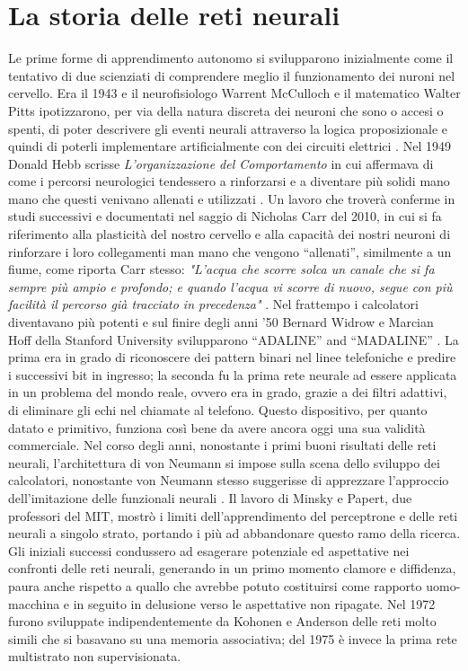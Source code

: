 \section*{La storia delle reti neurali}
Le prime forme di apprendimento autonomo si svilupparono inizialmente come il tentativo di due scienziati di  comprendere meglio il funzionamento dei nuroni nel cervello.
Era il 1943 e il neurofisiologo Warrent McCulloch e il matematico Walter Pitts ipotizzarono, per via della natura discreta dei neuroni che sono o accesi o spenti, di poter descrivere gli eventi neurali attraverso la logica proposizionale e quindi di poterli implementare artificialmente con dei circuiti elettrici \cite{mcculloch1943logical}.
Nel 1949 Donald Hebb scrisse \textit{L'organizzazione del Comportamento} in cui affermava di come i percorsi neurologici tendessero a rinforzarsi e a diventare più solidi mano mano che questi venivano allenati e utilizzati \cite{hebb1961organization}. Un lavoro che troverà conferme in studi successivi e documentati nel saggio di Nicholas Carr del 2010, in cui si fa riferimento alla plasticità del nostro cervello e alla capacità dei nostri neuroni di rinforzare i loro collegamenti man mano che vengono ``allenati'', similmente a un fiume, come riporta Carr stesso: \emph{"L'acqua che scorre solca un canale che si fa sempre più ampio e profondo; e quando l'acqua vi scorre di nuovo, segue con più facilità il percorso già tracciato in precedenza"} \cite{carr2010shallows}.
Nel frattempo i calcolatori diventavano più potenti e sul finire degli anni '50 Bernard Widrow e Marcian Hoff della Stanford University svilupparono ``ADALINE'' and ``MADALINE'' \cite{widrow1960adaptive}. La prima era in grado di riconoscere dei pattern binari nel linee telefoniche e predire i successivi bit in ingresso; la seconda fu la prima rete neurale ad essere applicata in un problema del mondo reale, ovvero era in grado, grazie a dei filtri adattivi, di eliminare gli echi nel chiamate al telefono. Questo dispositivo, per quanto datato e primitivo, funziona così bene da avere ancora oggi una sua validità commerciale.
Nel corso degli anni, nonostante i primi buoni risultati delle reti neurali, l'architettura di von Neumann si impose sulla scena dello sviluppo dei calcolatori, nonostante von Neumann stesso suggerisse di apprezzare l'approccio dell'imitazione delle funzionali neurali \cite{stanford_history}.
Il lavoro di Minsky e Papert, due professori del MIT, mostrò i limiti dell'apprendimento del perceptrone e delle reti neurali a singolo strato, portando i più ad abbandonare questo ramo della ricerca\cite{minsky2017perceptrons}. Gli iniziali successi condussero ad esagerare potenziale ed aspettative nei confronti delle reti neurali, generando in un primo momento clamore e diffidenza, paura anche rispetto a quallo che avrebbe potuto costituirsi come rapporto uomo-macchina e in seguito in delusione verso le aspettative non ripagate. 
Nel 1972 furono sviluppate indipendentemente da Kohonen e Anderson delle reti molto simili che si basavano su una memoria associativa\cite{kohonen1972correlation}; del 1975 è invece la prima rete multistrato non supervisionata.

